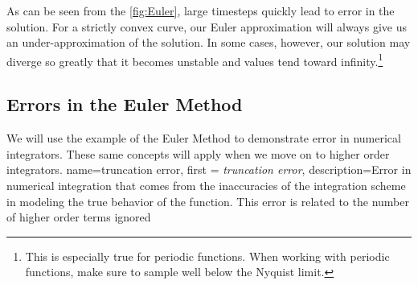\documentclass[12pt]{report}
\begin{document}
As can be seen from the \ref{fig:Euler}, large timesteps quickly lead to error in the solution. For a strictly convex curve, our Euler approximation will always give us an under-approximation of the solution. In some cases, however, our solution may diverge so greatly that it becomes unstable and values tend toward infinity.\footnote{This is especially true for periodic functions. When working with periodic functions, make sure to sample well below the Nyquist limit.}
 


\subsection{Errors in the Euler Method}\label{sec:errors in the euler method}
We will use the example of the Euler Method to demonstrate error in numerical integrators. These same concepts will apply when we move on to higher order integrators. 
{
    name=truncation error,
    first = {\textit{truncation error}},
    description={Error in numerical integration that comes from the inaccuracies of the integration scheme in modeling the true behavior of the function. This error is related to the number of higher order terms ignored}
}
\end{document}
